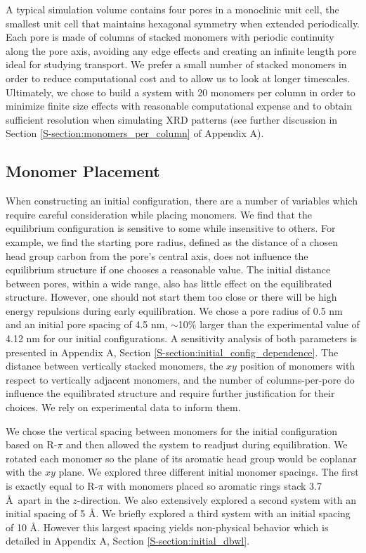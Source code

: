   A typical simulation volume contains four pores in a monoclinic unit cell,
  the smallest unit cell that maintains hexagonal symmetry when extended
  periodically. Each pore is made of columns of stacked monomers with periodic
  continuity along the pore axis, avoiding any edge effects and creating an
  infinite length pore ideal for studying transport. We prefer a small number of stacked
  monomers in order to reduce computational cost and to allow us to look at
  longer timescales. Ultimately, we chose to build a system with 20 monomers
  per column in order to minimize finite size effects with reasonable computational expense 
  and to obtain sufficient resolution when simulating XRD patterns (see further discussion
  in Section \ref{S-section:monomers_per_column} of Appendix A).
 
  \subsection{Monomer Placement}\label{method:monomer_placement}

  When constructing an initial configuration, there are a number of variables
  which require careful consideration while placing monomers. We find that the
  equilibrium configuration is sensitive to some while insensitive to others. For
  example, we find the starting pore radius, defined as the distance of a chosen
  head group carbon from the pore's central axis, does not influence the
  equilibrium structure if one chooses a reasonable value. The initial distance
  between pores, within a wide range, also has little effect on the equilibrated
  structure. However, one should not start them too close or there will be high
  energy repulsions during early equilibration. We chose a pore radius of 0.5 nm
  and an initial pore spacing of 4.5 nm, $\sim$10\% larger than the experimental
  value of 4.12 nm for our initial configurations. A sensitivity analysis of both
  parameters is presented in Appendix A, Section
  \ref{S-section:initial_config_dependence}. The distance between vertically
  stacked monomers, the $xy$ position of monomers with respect to vertically
  adjacent monomers, and the number of columns-per-pore do influence the
  equilibrated structure and require further justification for their choices. We
  rely on experimental data to inform them. 

  We chose the vertical spacing between monomers for the initial configuration
  based on R-$\pi$ and then allowed the system to readjust during equilibration.
  We rotated each monomer so the plane of its aromatic head group would be
  coplanar with the $xy$ plane. We explored three different initial monomer
  spacings. The first is exactly equal to R-$\pi$ with monomers placed so
  aromatic rings stack 3.7 \AA~apart in the $z$-direction. We also extensively
  explored a second system with an initial spacing of 5 \AA. We briefly explored
  a third system with an initial spacing of 10 \AA. However this largest spacing
  yields non-physical behavior which is detailed in Appendix A, Section
  \ref{S-section:initial_dbwl}. 

